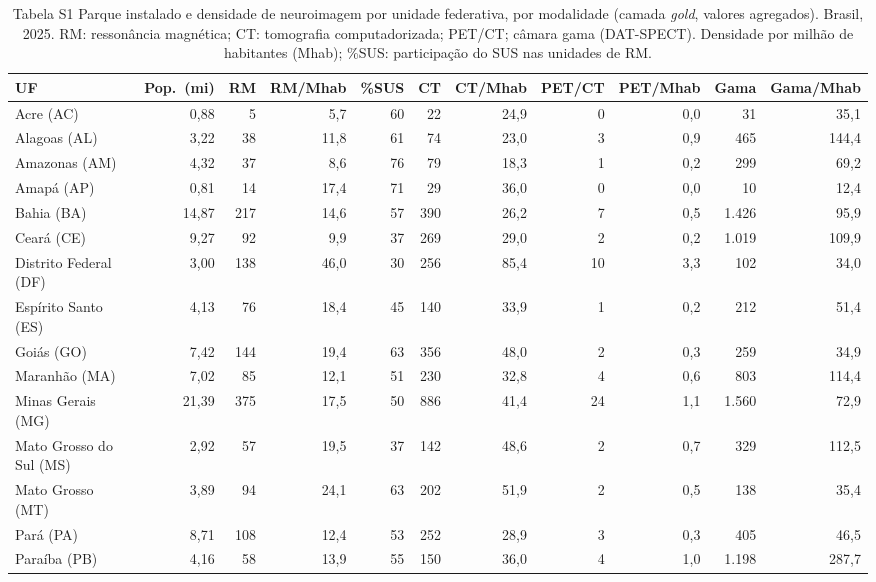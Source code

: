 \documentclass[11pt,a4paper]{article}
\begin{document}
\begin{landscape}
\begin{table}[htbp]\centering\footnotesize
\caption{Tabela S1 \textendash{} Parque instalado e densidade de
neuroimagem por unidade federativa, por modalidade (camada
\emph{gold}, valores agregados). Brasil, 2025. RM: ressonância
magnética; CT: tomografia computadorizada; PET/CT; câmara gama
(DAT-SPECT). Densidade por milhão de habitantes (Mhab); \%SUS:
participação do SUS nas unidades de RM.}
\setlength{\tabcolsep}{4pt}
\begin{tabular}{l r r r r r r r r r r}
\toprule
\textbf{UF} & \textbf{Pop.\ (mi)} & \textbf{RM} & \textbf{RM/Mhab} & \textbf{\%SUS} & \textbf{CT} & \textbf{CT/Mhab} & \textbf{PET/CT} & \textbf{PET/Mhab} & \textbf{Gama} & \textbf{Gama/Mhab} \\
\midrule
Acre (AC) & 0,88 & 5 & 5,7 & 60 & 22 & 24,9 & 0 & 0,0 & 31 & 35,1 \\
Alagoas (AL) & 3,22 & 38 & 11,8 & 61 & 74 & 23,0 & 3 & 0,9 & 465 & 144,4 \\
Amazonas (AM) & 4,32 & 37 & 8,6 & 76 & 79 & 18,3 & 1 & 0,2 & 299 & 69,2 \\
Amapá (AP) & 0,81 & 14 & 17,4 & 71 & 29 & 36,0 & 0 & 0,0 & 10 & 12,4 \\
Bahia (BA) & 14,87 & 217 & 14,6 & 57 & 390 & 26,2 & 7 & 0,5 & 1.426 & 95,9 \\
Ceará (CE) & 9,27 & 92 & 9,9 & 37 & 269 & 29,0 & 2 & 0,2 & 1.019 & 109,9 \\
Distrito Federal (DF) & 3,00 & 138 & 46,0 & 30 & 256 & 85,4 & 10 & 3,3 & 102 & 34,0 \\
Espírito Santo (ES) & 4,13 & 76 & 18,4 & 45 & 140 & 33,9 & 1 & 0,2 & 212 & 51,4 \\
Goiás (GO) & 7,42 & 144 & 19,4 & 63 & 356 & 48,0 & 2 & 0,3 & 259 & 34,9 \\
Maranhão (MA) & 7,02 & 85 & 12,1 & 51 & 230 & 32,8 & 4 & 0,6 & 803 & 114,4 \\
Minas Gerais (MG) & 21,39 & 375 & 17,5 & 50 & 886 & 41,4 & 24 & 1,1 & 1.560 & 72,9 \\
Mato Grosso do Sul (MS) & 2,92 & 57 & 19,5 & 37 & 142 & 48,6 & 2 & 0,7 & 329 & 112,5 \\
Mato Grosso (MT) & 3,89 & 94 & 24,1 & 63 & 202 & 51,9 & 2 & 0,5 & 138 & 35,4 \\
Pará (PA) & 8,71 & 108 & 12,4 & 53 & 252 & 28,9 & 3 & 0,3 & 405 & 46,5 \\
Paraíba (PB) & 4,16 & 58 & 13,9 & 55 & 150 & 36,0 & 4 & 1,0 & 1.198 & 287,7 \\

\end{tabular}
\end{table}
\end{landscape}
\end{document}

